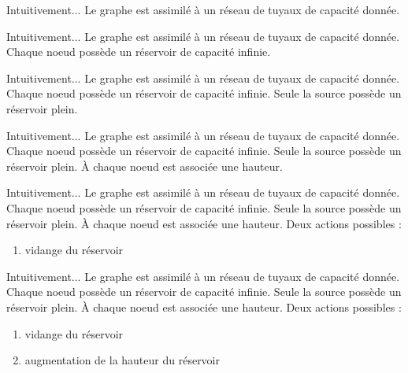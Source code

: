 
\begin{frame}{Intuitivement...}
	Le graphe est assimilé à un réseau de tuyaux de capacité donnée.\vfill
\end{frame}

\begin{frame}{Intuitivement...}
	Le graphe est assimilé à un réseau de tuyaux de capacité donnée.\vfill
	Chaque noeud possède un réservoir de capacité infinie.\vfill
\end{frame}

\begin{frame}{Intuitivement...}
	Le graphe est assimilé à un réseau de tuyaux de capacité donnée.\vfill
	Chaque noeud possède un réservoir de capacité infinie.\vfill
	Seule la source possède un réservoir plein. \vfill
\end{frame}

\begin{frame}{Intuitivement...}
	Le graphe est assimilé à un réseau de tuyaux de capacité donnée.\vfill
	Chaque noeud possède un réservoir de capacité infinie.\vfill
	Seule la source possède un réservoir plein. \vfill
	À chaque noeud est associée une hauteur.\vfill
\end{frame}

\begin{frame}{Intuitivement...}
	Le graphe est assimilé à un réseau de tuyaux de capacité donnée.\vfill
	Chaque noeud possède un réservoir de capacité infinie.\vfill
	Seule la source possède un réservoir plein. \vfill
	À chaque noeud est associée une hauteur.\vfill
	Deux actions possibles : \begin{enumerate}
		\item vidange du réservoir
	\end{enumerate} \vfill
\end{frame}

\begin{frame}{Intuitivement...}
	Le graphe est assimilé à un réseau de tuyaux de capacité donnée.\vfill
	Chaque noeud possède un réservoir de capacité infinie.\vfill
	Seule la source possède un réservoir plein. \vfill
	À chaque noeud est associée une hauteur.\vfill
	Deux actions possibles : \begin{enumerate}
		\item vidange du réservoir
		\item augmentation de la hauteur du réservoir
	\end{enumerate} \vfill
\end{frame}

